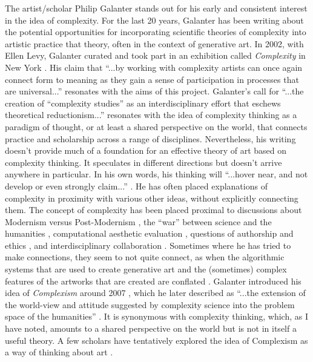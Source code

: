         The artist/scholar Philip Galanter stands out for his early and consistent interest in the idea of complexity. For the last 20 years, Galanter has been writing about the potential opportunities for incorporating scientific theories of complexity into artistic practice that theory, often in the context of generative art. In 2002, with Ellen Levy, Galanter curated and took part in an exhibition called \emph{Complexity} in New York \citep{GalanterLevyComplexity2003}. His claim that “...by working with complexity artists can once again connect form to meaning as they gain a sense of participation in processes that are universal...” resonates with the aims of this project. Galanter's call for “...the creation of “complexity studies” as an interdisciplinary effort that eschews theoretical reductionism...” resonates with the idea of complexity thinking as a paradigm of thought, or at least a shared perspective on the world, that connects practice and scholarship across a range of disciplines. Nevertheless, his writing doesn't provide much of a foundation for an effective theory of art based on complexity thinking. It speculates in different directions but doesn't arrive anywhere in particular. In his own words, his thinking will “...hover near, and not develop or even strongly claim...” \citep[p.2]{GalanterAgnstRdctnsm2010}. He has often placed explanations of complexity in proximity with various other ideas, without explicitly connecting them. The concept of complexity has been placed proximal to discussions about Modernism versus Post-Modernism \citep{GalanterSystmsInArtMkng}, the “war” between science and the humanities \citep{GalanterShtByBthSds2011}, computational aesthetic evaluation \citep{GalanterThPrblmWthEvltnryArt2010} \citep{GalanterCmpttnlAsthtcEvltn2012} \citep{GalanterAutonomoutIntelligentLightAndSoundSculptures2014}, questions of authorship and ethics \citep{GalanterTwrdsEthclRltnshpsWthMchns2020}, and interdisciplinary collaboration \citep{GalanterAgnstRdctnsm2010} \citep{GalanterShtByBthSds2011}. Sometimes where he has tried to make connections, they seem to not quite connect, as when the algorithmic systems that are used to create generative art and the (sometimes) complex features of the artworks that are created are conflated \citep{GalanterWhtIsGnrtvArt2003} \citep{GalanterGnrtvArtThry2016}. Galanter introduced his idea of \emph{Complexism} around 2007 \citep{GalanterCmplxsmAndThRlOfEvltnryArt2007}, which he later described as “...the extension of the world-view and attitude suggested by complexity science into the problem space of the humanities” \citep{GalanterAnIntrdctnToCmplxsm2016}. It is synonymous with complexity thinking, which, as I have noted, amounts to a shared perspective on the world but is not in itself a useful theory. A few scholars have tentatively explored the idea of Complexism as a way of thinking about art \citep{TinaOnCmplxsm2016} \citep{TrombleVlnrbltyBrtltyHp2016}.

